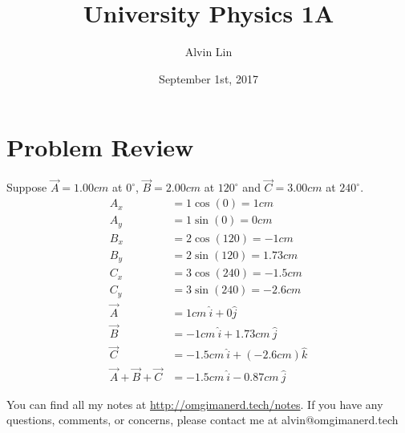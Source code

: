 \documentclass{math}
\title{University Physics 1A}
\author{Alvin Lin}
\date{September 1st, 2017}
\begin{document}
\maketitle

\section*{Problem Review}
Suppose \( \vec{A} = 1.00cm \) at \( 0^{\circ} \), \( \vec{B} = 2.00cm \) at
\( 120^{\circ} \) and \( \vec{C} = 3.00cm \) at \( 240^{\circ} \).
\begin{align*}
  A_{x} &= 1\cos(0) = 1cm \\
  A_{y} &= 1\sin(0) = 0cm \\
  B_{x} &= 2\cos(120) = -1cm \\
  B_{y} &= 2\sin(120) = 1.73 cm \\
  C_{x} &= 3\cos(240) = -1.5cm \\
  C_{y} &= 3\sin(240) =-2.6cm \\
  \vec{A} &= 1cm\ \hat{i}+0\hat{j} \\
  \vec{B} &= -1cm\ \hat{i}+1.73cm\ \hat{j} \\
  \vec{C} &= -1.5cm\ \hat{i}+(-2.6cm)\hat{k} \\
  \vec{A}+\vec{B}+\vec{C} &= -1.5cm\ \hat{i}-0.87cm\ \hat{j}
\end{align*}

\begin{center}
  You can find all my notes at \url{http://omgimanerd.tech/notes}. If you have
  any questions, comments, or concerns, please contact me at
  alvin@omgimanerd.tech
\end{center}
\end{document}
